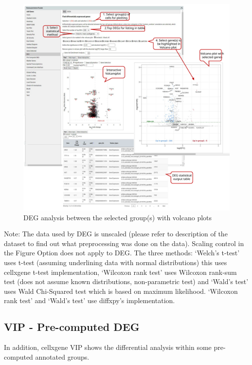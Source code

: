 \documentclass[
]{article}
\begin{document}
\begin{figure}
\centering
\includegraphics{figures/F19_label.svg}
\caption{DEG analysis between the selected group(s) with volcano plots}
\end{figure}

Note: The data used by DEG is unscaled (please refer to description of the dataset to find out what preprocessing was done on the data). Scaling control in the Figure Option does not apply to DEG. The three methods: `Welch's t-test' uses t-test (assuming underlining data with normal distributions) this uses cellxgene t-test implementation, `Wilcoxon rank test' uses Wilcoxon rank-sum test (does not assume known distributions, non-parametric test) and `Wald's test' uses Wald Chi-Squared test which is based on maximum likelihood. `Wilcoxon rank test' and `Wald's test' use diffxpy's implementation.

\hypertarget{vip---pre-computed-deg}{%
\subsection{VIP - Pre-computed DEG}\label{vip---pre-computed-deg}}

In addition, cellxgene VIP shows the differential analysis within some pre-computed annotated groups.
\end{document}
